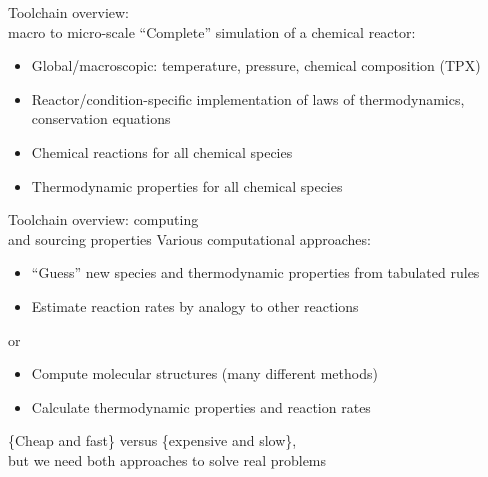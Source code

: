 \begin{frame}{Toolchain overview:\\ macro to micro-scale}
``Complete'' simulation of a chemical reactor:

\vspace{0.5cm}

 \begin{itemize}
  \item Global/macroscopic: temperature, pressure, chemical composition (TPX)
  \item Reactor/condition-specific implementation of laws of thermodynamics, conservation equations
  \item Chemical reactions for all chemical species
  \item Thermodynamic properties for all chemical species
 \end{itemize}
\end{frame}

\begin{frame}{Toolchain overview: computing\\ and sourcing properties}
Various computational approaches:

\vspace{0.5cm}

 \begin{itemize}
  \item ``Guess'' new species and thermodynamic properties from tabulated rules
  \item Estimate reaction rates by analogy to other reactions
 \end{itemize}
 
 or
 
 \begin{itemize}
  \item Compute molecular structures (many different methods)
  \item Calculate thermodynamic properties and reaction rates
 \end{itemize}
 
 \vspace{0.5cm}
 
 \{Cheap and fast\} versus \{expensive and slow\},\\
 but we need both approaches to solve real problems
\end{frame}

